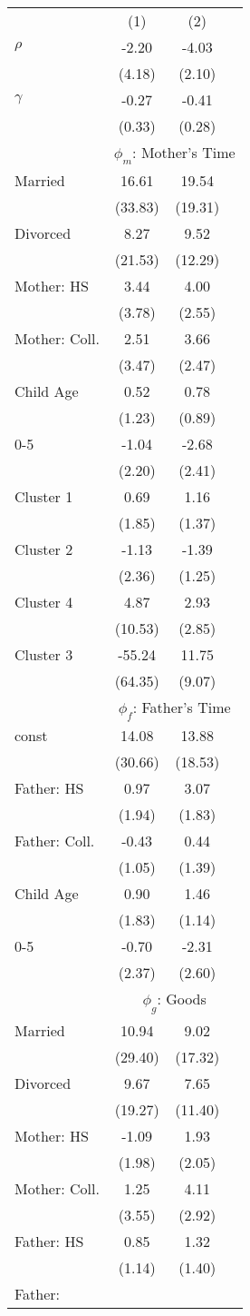 \begin{tabular}{lccc}\\\toprule
&(1)&(2)&\\\cmidrule(r){2-4}$\rho$&-2.20&-4.03&\\
&(4.18)&(2.10)&\\
$\gamma$&-0.27&-0.41&\\
&(0.33)&(0.28)&\\
& \multicolumn{3}{c}{$\phi_{m}$: Mother's Time}\\\cmidrule(r){2-4}Married&16.61&19.54&\\&(33.83)&(19.31)&\\Divorced&8.27&9.52&\\&(21.53)&(12.29)&\\Mother: HS&3.44&4.00&\\&(3.78)&(2.55)&\\Mother: Coll.&2.51&3.66&\\&(3.47)&(2.47)&\\Child Age&0.52&0.78&\\&(1.23)&(0.89)&\\0-5&-1.04&-2.68&\\&(2.20)&(2.41)&\\Cluster 1&0.69&1.16&\\&(1.85)&(1.37)&\\Cluster 2&-1.13&-1.39&\\&(2.36)&(1.25)&\\Cluster 4&4.87&2.93&\\&(10.53)&(2.85)&\\Cluster 3&-55.24&11.75&\\&(64.35)&(9.07)&\\& \multicolumn{3}{c}{$\phi_{f}$: Father's Time}\\\cmidrule(r){2-4}const&14.08&13.88&\\&(30.66)&(18.53)&\\Father: HS&0.97&3.07&\\&(1.94)&(1.83)&\\Father: Coll.&-0.43&0.44&\\&(1.05)&(1.39)&\\Child Age&0.90&1.46&\\&(1.83)&(1.14)&\\0-5&-0.70&-2.31&\\&(2.37)&(2.60)&\\& \multicolumn{3}{c}{$\phi_{g}$: Goods}\\\cmidrule(r){2-4}Married&10.94&9.02&\\&(29.40)&(17.32)&\\Divorced&9.67&7.65&\\&(19.27)&(11.40)&\\Mother: HS&-1.09&1.93&\\&(1.98)&(2.05)&\\Mother: Coll.&1.25&4.11&\\&(3.55)&(2.92)&\\Father: HS&0.85&1.32&\\&(1.14)&(1.40)&\\Father: 
\end{tabular}
